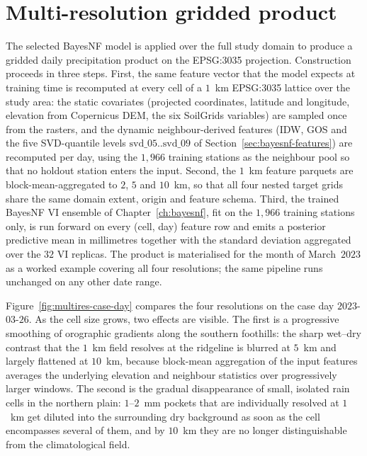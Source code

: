\section{Multi-resolution gridded product}
\label{sec:comparison-multires}

The selected BayesNF model is applied over the full study domain to
produce a gridded daily precipitation product on the EPSG:3035
projection. Construction proceeds in three steps. First, the same
feature vector that the model expects at training time is recomputed
at every cell of a $1$~km EPSG:3035 lattice over the study area: the
static covariates (projected coordinates, latitude and longitude,
elevation from Copernicus DEM, the six SoilGrids variables) are
sampled once from the rasters, and the dynamic neighbour-derived
features (IDW, GOS and the five SVD-quantile levels
$\mathrm{svd}\_05..\mathrm{svd}\_09$ of
Section~\ref{sec:bayesnf-features}) are recomputed per day, using the
$1{,}966$ training stations as the neighbour pool so that no holdout
station enters the input. Second, the $1$~km feature parquets are
block-mean-aggregated to $2$, $5$ and $10$~km, so that all four nested
target grids share the same domain extent, origin and feature schema.
Third, the trained BayesNF VI ensemble of Chapter~\ref{ch:bayesnf},
fit on the $1{,}966$ training stations only, is run forward on every
(cell, day) feature row and emits a posterior predictive mean in
millimetres together with the standard deviation aggregated over the
$32$ VI replicas. The product is materialised for the month of
March~$2023$ as a worked example covering all four resolutions; the
same pipeline runs unchanged on any other date range.

Figure~\ref{fig:multires-case-day} compares the four resolutions on
the case day $2023$-$03$-$26$. As the cell size grows, two effects
are visible. The first is a progressive smoothing of orographic
gradients along the southern foothills: the sharp wet--dry contrast
that the $1$~km field resolves at the ridgeline is blurred at $5$~km
and largely flattened at $10$~km, because block-mean aggregation of
the input features averages the underlying elevation and neighbour
statistics over progressively larger windows. The second is the
gradual disappearance of small, isolated rain cells in the northern
plain: $1$--$2$~mm pockets that are individually resolved at $1$~km
get diluted into the surrounding dry background as soon as the cell
encompasses several of them, and by $10$~km they are no longer
distinguishable from the climatological field.

